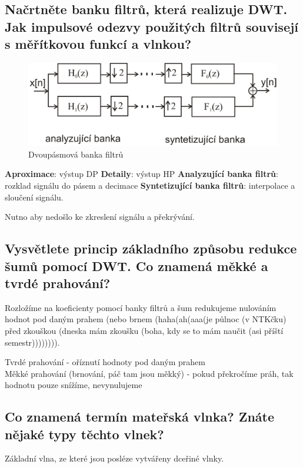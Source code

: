 \documentclass[a4paper,12pt]{article}   %
\begin{document}
\subsection{Načrtněte banku filtrů, která realizuje DWT. Jak impulsové odezvy použitých filtrů souvisejí s měřítkovou funkcí a vlnkou?}
\begin{figure}
        \centering
        \includegraphics[width=.6\textwidth]{fig/banka_filtru.png}
        \caption*{Dvoupásmová banka filtrů}
\end{figure}

\begin{outline}
        \1 \textbf{Aproximace}: výstup DP 
        \1 \textbf{Detaily}: výstup HP
        \1 \textbf{Analyzující banka filtrů}: rozklad signálu do pásem a decimace
        \1 \textbf{Syntetizující banka filtrů}: interpolace a sloučení signálu.
\end{outline}

Nutno aby nedošlo ke zkreslení signálu a překrývání. 


\subsection{Vysvětlete princip základního způsobu redukce šumů pomocí DWT. Co znamená měkké a tvrdé prahování?}

Rozložíme na koeficienty pomocí banky filtrů a šum redukujeme nulováním hodnot pod daným prahem (nebo brnem (haha(ah(aaa(je půlnoc (v NTKčku) před zkouškou (dneska mám zkoušku (boha, kdy se to mám naučit (asi příští semestr)))))))). 

Tvrdé prahování - oříznutí hodnoty pod daným prahem\\
Měkké prahování (brnování, páč tam jsou měkký) - pokud překročíme práh, tak hodnotu pouze snížíme, nevynulujeme



\subsection{Co znamená termín mateřská vlnka? Znáte nějaké typy těchto vlnek?}

Základní vlna, ze které jsou posléze vytvářeny dceřiné vlnky. 
\end{document}
